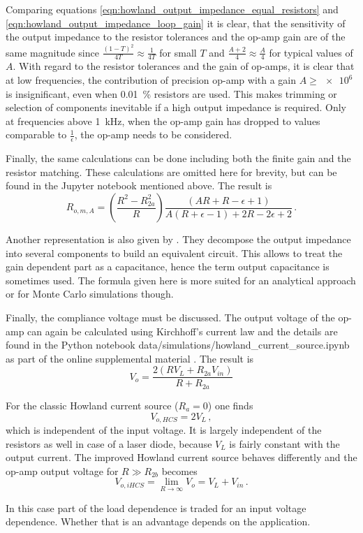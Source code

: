 \documentclass[12pt]{book}
\providecommand{\external}[1]{\textsf{#1}}
\begin{document}
Comparing equations \ref{eqn:howland_output_impedance_equal_resistors} and \ref{eqn:howland_output_impedance_loop_gain} it is clear, that the sensitivity of the output impedance to the resistor tolerances and the op-amp gain are of the same magnitude since $\frac{(1-T)^2}{4 T} \approx \frac{1}{4T}$ for small $T$ and $\frac{A+2}{4} \approx \frac A 4$ for typical values of $A$. With regard to the resistor tolerances and the gain of op-amps, it is clear that at low frequencies, the contribution of precision op-amp with a gain $A \geq \num{e6}$ is insignificant, even when \qty{0.01}{\percent} resistors are used. This makes trimming or selection of components inevitable if a high output impedance is required. Only at frequencies above \qty{1}{\kHz}, when the op-amp gain has dropped to values comparable to $\frac{1}{\epsilon}$, the op-amp needs to be considered.

Finally, the same calculations can be done including both the finite gain and the resistor matching. These calculations are omitted here for brevity, but can be found in the Jupyter notebook mentioned above. The result is
\begin{equation}
    R_{o,m,A} = \left(\frac{R^2 - R_{2a}^2}{R}\right) \frac{\left(A R + R - \epsilon + 1\right)}{A \left(R + \epsilon - 1\right) + 2 R - 2 \epsilon + 2}\,.\label{eqn:appendix_howland_output_impedance_resistors_gain}
\end{equation}

Another representation is also given by \citeauthor{howland_comprehensive} \cite{howland_comprehensive}. They decompose the output impedance into several components to build an equivalent circuit. This allows to treat the gain dependent part as a capacitance, hence the term output capacitance is sometimes used. The formula given here is more suited for an analytical approach or for Monte Carlo simulations though.

Finally, the compliance voltage must be discussed. The output voltage of the op-amp can again be calculated using Kirchhoff's current law and the details are found in the Python notebook \external{data/simulations/howland\_current\_source.ipynb} as part of the online supplemental material \cite{supplemental_material}. The result is
\begin{equation}
    V_o = \frac{2 \left(R V_L + R_{2a} V_{in}\right)}{R + R_{2a}}
\end{equation}

For the classic Howland current source ($R_a = 0$) one finds
\begin{equation}
    V_{o,HCS} = 2 V_L\,,\label{eqn:howland_current_compliance_voltage}
\end{equation}
which is independent of the input voltage. It is largely independent of the resistors as well in case of a laser diode, because $V_L$ is fairly constant with the output current. The improved Howland current source behaves differently and the op-amp output voltage for $R \gg R_{2b}$ becomes
\begin{equation}
    V_{o,iHCS} = \lim_{R \to \infty} V_o = V_L + V_{in}\,.\label{eqn:improved_howland_current_compliance_voltage}
\end{equation}

In this case part of the load dependence is traded for an input voltage dependence. Whether that is an advantage depends on the application.
\end{document}
